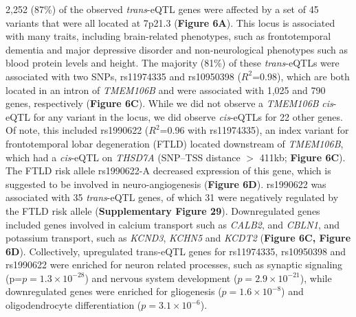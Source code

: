 2,252 (87\%) of the observed \emph{trans}-eQTL genes were affected by a set of 45 variants that were all located at 7p21.3 (\textbf{Figure 6A}). This locus is associated with many traits, including brain-related phenotypes, such as frontotemporal dementia and major depressive disorder and non-neurological phenotypes such as blood protein levels and height. The majority (81\%) of these \emph{trans}-eQTLs were associated with two SNPs, rs11974335 and rs10950398 ($R^2$=0.98), which are both located in an intron of \emph{TMEM106B} and were associated with 1,025 and 790 genes, respectively (\textbf{Figure 6C}). While we did not observe a \emph{TMEM106B} \emph{cis}-eQTL for any variant in the locus, we did observe \emph{cis}-eQTLs for 22 other genes. Of note, this included rs1990622 ($R^2$=0.96 with rs11974335), an index variant for frontotemporal lobar degeneration\cite{liGeneticVariantsAssociated2018} (FTLD) located downstream of \emph{TMEM106B}, which had a \emph{cis}-eQTL on \emph{THSD7A} (SNP–TSS distance $>$ 411kb; \textbf{Figure 6C}). The FTLD risk allele rs1990622-A decreased expression of this gene, which is suggested to be involved in neuro-angiogenesis\cite{kuoSolubleTHSD7ANGlycoprotein2011} (\textbf{Figure 6D}). rs1990622 was associated with 35 \emph{trans}-eQTL genes, of which 31 were negatively regulated by the FTLD risk allele (\textbf{Supplementary Figure 29}). Downregulated genes included genes involved in calcium transport such as \emph{CALB2}, and \emph{CBLN1}, and potassium transport, such as \emph{KCND3}, \emph{KCHN5} and \emph{KCDT2} (\textbf{Figure 6C, Figure 6D}). Collectively, upregulated trans-eQTL genes for rs11974335, rs10950398 and rs1990622 were enriched for neuron related processes, such as synaptic signaling (p=$p=1.3 \times 10^{-28}$) and nervous system development ($p=2.9 \times 10^{-21}$), while downregulated genes were enriched for gliogenesis ($p=1.6 \times 10^{-8}$) and oligodendrocyte differentiation ($p=3.1 \times 10^{-6}$). 

